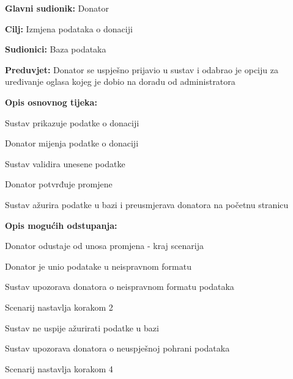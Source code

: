 					\noindent {}
					\begin{packed_item}
	
						\item \textbf{Glavni sudionik: }Donator
						\item  \textbf{Cilj:} Izmjena podataka o donaciji
						\item  \textbf{Sudionici:} Baza podataka
						\item  \textbf{Preduvjet:} Donator se uspješno prijavio u sustav i odabrao je opciju za uređivanje oglasa kojeg je dobio na doradu od administratora
						\eject
						\item  \textbf{Opis osnovnog tijeka:}
						
						\item[] \begin{packed_enum}
							\item Sustav prikazuje podatke o donaciji
							\item Donator mijenja podatke o donaciji
							\item Sustav validira unesene podatke
							\item Donator potvrđuje promjene
							\item Sustav ažurira podatke u bazi i preusmjerava donatora na početnu stranicu
						\end{packed_enum}

						\item  \textbf{Opis mogućih odstupanja:}

						\item[] \begin{packed_item}
							\item[2.a] Donator odustaje od unosa promjena - kraj scenarija
							\item[3.a] Donator je unio podatake u neispravnom formatu
							\item[] \begin{packed_enum}
								\item Sustav upozorava donatora o neispravnom formatu podataka
								\item Scenarij nastavlja korakom 2 
							\end{packed_enum}	
							\item[5.a] Sustav ne uspije ažurirati podatke u bazi
							\item[] \begin{packed_enum}
								\item Sustav upozorava donatora o neuspješnoj pohrani podataka
								\item Scenarij nastavlja korakom 4
							\end{packed_enum}					
						\end{packed_item}
					\end{packed_item}

